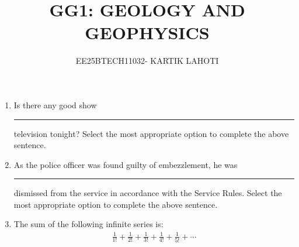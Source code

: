 \documentclass[journal,12pt,onecolumn]{IEEEtran}
\title{GG1: GEOLOGY AND GEOPHYSICS}
\author{EE25BTECH11032- KARTIK LAHOTI}
\theoremstyle{remark}
\begin{document}
\maketitle

\begin{enumerate}

\item Is there any good show \rule{3cm}{0.15mm} television tonight?
Select the most appropriate option to complete the above sentence. \hfill{}
\begin{enumerate}
\end{enumerate}

\item As the police officer was found guilty of embezzlement, he was \rule{3cm}{0.15mm} dismissed from the service in accordance with the Service Rules.
Select the most appropriate option to complete the above sentence. \hfill{}
\begin{enumerate}
\end{enumerate}

\item The sum of the following infinite series is:
\begin{align*}
\frac{1}{1!} + \frac{1}{2!} + \frac{1}{3!} + \frac{1}{4!} + \frac{1}{5!} + \cdots
\end{align*}
\hfill{}
\begin{enumerate}
\end{enumerate}


\end{enumerate}
\end{document}
